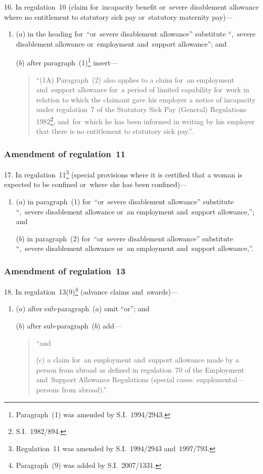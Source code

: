 \documentclass[12pt,a4paper]{article}
\begin{document}
16.  In regulation~10 (claim for~incapacity benefit or~severe disablement allowance where no entitlement to statutory sick pay or~statutory maternity pay)—
\begin{enumerate}\item[]
($a$) in the heading for~“or~severe disablement allowance” substitute “,~severe disablement allowance or~employment and~support allowance”; and

($b$) after paragraph~(1)\footnote{Paragraph~(1) was amended by S.I.~1994/2943.} insert—
\begin{quotation}
“(1A) Paragraph~(2) also applies to a claim for~an employment and~support allowance for~a period of limited capability for~work in relation to which the claimant gave his employer a notice of incapacity under regulation~7 of the Statutory Sick Pay (General) Regulations 1982\footnote{S.I.~1982/894.}, and~for~which he has been informed in writing by his employer that there is no entitlement to statutory sick pay.”.
\end{quotation}
\end{enumerate}

\subsubsection[17. Amendment of regulation~11]{Amendment of regulation~11}

17.  In regulation~11\footnote{Regulation~11 was amended by S.I.~1994/2943 and~1997/793.} (special provisions where it is certified that a woman is expected to be confined or~where she has been confined)—
\begin{enumerate}\item[]
($a$) in paragraph~(1) for~“or~severe disablement allowance” substitute “,~severe disablement allowance or~an employment and~support allowance,”; and

($b$) in paragraph~(2) for~“or~severe disablement allowance” substitute “,~severe disablement allowance or~an employment and~support allowance,”.
\end{enumerate}

\subsubsection[18. Amendment of regulation~13]{Amendment of regulation~13}

18.  In regulation~13(9)\footnote{Paragraph~(9) was added by S.I.~2007/1331.} (advance claims and~awards)—
\begin{enumerate}\item[]
($a$) after sub-paragraph~($a$)  omit “or”; and

($b$) after sub-paragraph~($b$)  add—
\begin{quotation}
“and

($c$) a claim for~an employment and~support allowance made by a person from abroad as defined in regulation~70 of the Employment and~Support Allowance Regulations (special cases: supplemental---persons from abroad).”.
\end{quotation}
\end{enumerate}
\end{document}

